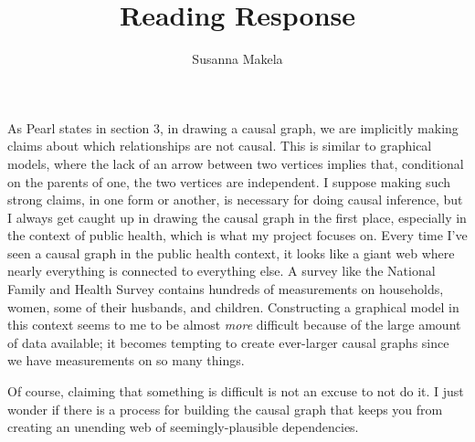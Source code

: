 \documentclass[10pt,a4paper]{article}
\author{Susanna Makela}
\title{Reading Response}
\begin{document}
\maketitle

As Pearl states in section 3, in drawing a causal graph, we are implicitly making claims about which relationships are not causal. This is similar to graphical models, where the lack of an arrow between two vertices implies that, conditional on the parents of one, the two vertices are independent. I suppose making such strong claims, in one form or another, is necessary for doing causal inference, but I always get caught up in drawing the causal graph in the first place, especially in the context of public health, which is what my project focuses on. Every time I've seen a causal graph in the public health context, it looks like a giant web where nearly everything is connected to everything else. A survey like the National Family and Health Survey contains hundreds of measurements on households, women, some of their husbands, and children. Constructing a graphical model in this context seems to me to be almost \textit{more} difficult because of the large amount of data available; it becomes tempting to create ever-larger causal graphs since we have measurements on so many things.

Of course, claiming that something is difficult is not an excuse to not do it. I just wonder if there is a process for building the causal graph that keeps you from creating an unending web of seemingly-plausible dependencies.
\end{document}
